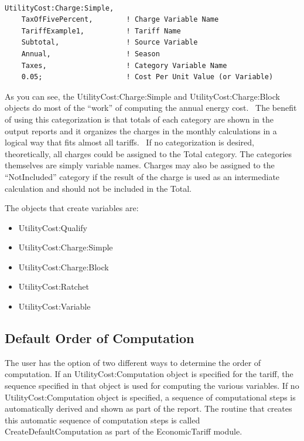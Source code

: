 \begin{lstlisting}

UtilityCost:Charge:Simple,
    TaxOfFivePercent,        ! Charge Variable Name
    TariffExample1,          ! Tariff Name
    Subtotal,                ! Source Variable
    Annual,                  ! Season
    Taxes,                   ! Category Variable Name
    0.05;                    ! Cost Per Unit Value (or Variable)
\end{lstlisting}

As you can see, the UtilityCost:Charge:Simple and UtilityCost:Charge:Block objects do most of the ``work'' of computing the annual energy cost.~ The benefit of using this categorization is that totals of each category are shown in the output reports and it organizes the charges in the monthly calculations in a logical way that fits almost all tariffs.~ If no categorization is desired, theoretically, all charges could be assigned to the Total category. The categories themselves are simply variable names. Charges may also be assigned to the ``NotIncluded'' category if the result of the charge is used as an intermediate calculation and should not be included in the Total.

The objects that create variables are:

\begin{itemize}
\item
  UtilityCost:Qualify
\item
  UtilityCost:Charge:Simple
\item
  UtilityCost:Charge:Block
\item
  UtilityCost:Ratchet
\item
  UtilityCost:Variable
\end{itemize}

\subsection{Default Order of Computation}\label{default-order-of-computation}

The user has the option of two different ways to determine the order of computation. If an UtilityCost:Computation object is specified for the tariff, the sequence specified in that object is used for computing the various variables. If no UtilityCost:Computation object is specified, a sequence of computational steps is automatically derived and shown as part of the report. The routine that creates this automatic sequence of computation steps is called CreateDefaultComputation as part of the EconomicTariff module.

